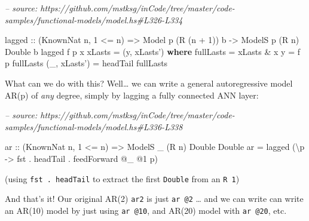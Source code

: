 \documentclass[]{article}
\newenvironment{Shaded}{}{}
\newcommand{\CommentTok}[1]{\textcolor[rgb]{0.38,0.63,0.69}{\textit{#1}}}
\newcommand{\DataTypeTok}[1]{\textcolor[rgb]{0.56,0.13,0.00}{#1}}
\newcommand{\DecValTok}[1]{\textcolor[rgb]{0.25,0.63,0.44}{#1}}
\newcommand{\FunctionTok}[1]{\textcolor[rgb]{0.02,0.16,0.49}{#1}}
\newcommand{\KeywordTok}[1]{\textcolor[rgb]{0.00,0.44,0.13}{\textbf{#1}}}
\newcommand{\NormalTok}[1]{#1}
\newcommand{\OtherTok}[1]{\textcolor[rgb]{0.00,0.44,0.13}{#1}}
\begin{document}
\begin{Shaded}
\begin{Highlighting}[]
\CommentTok{-- source: https://github.com/mstksg/inCode/tree/master/code-samples/functional-models/model.hs#L326-L334}

\NormalTok{lagged}
\OtherTok{    ::}\NormalTok{ (}\DataTypeTok{KnownNat}\NormalTok{ n, }\DecValTok{1} \FunctionTok{<=}\NormalTok{ n)}
    \OtherTok{=>} \DataTypeTok{Model}\NormalTok{  p       (}\DataTypeTok{R}\NormalTok{ (n }\FunctionTok{+} \DecValTok{1}\NormalTok{)) b}
    \OtherTok{->} \DataTypeTok{ModelS}\NormalTok{ p (}\DataTypeTok{R}\NormalTok{ n) }\DataTypeTok{Double}\NormalTok{      b}
\NormalTok{lagged f p x xLasts }\FunctionTok{=}\NormalTok{ (y, xLasts')}
  \KeywordTok{where}
\NormalTok{    fullLasts    }\FunctionTok{=}\NormalTok{ xLasts }\FunctionTok{&}\NormalTok{ x}
\NormalTok{    y            }\FunctionTok{=}\NormalTok{ f p fullLasts}
\NormalTok{    (_, xLasts') }\FunctionTok{=}\NormalTok{ headTail fullLasts}
\end{Highlighting}
\end{Shaded}

What can we do with this? Well\ldots{} we can write a general autoregressive
model AR(p) of \emph{any} degree, simply by lagging a fully connected ANN layer:

\begin{Shaded}
\begin{Highlighting}[]
\CommentTok{-- source: https://github.com/mstksg/inCode/tree/master/code-samples/functional-models/model.hs#L336-L338}

\OtherTok{ar ::}\NormalTok{ (}\DataTypeTok{KnownNat}\NormalTok{ n, }\DecValTok{1} \FunctionTok{<=}\NormalTok{ n)}
   \OtherTok{=>} \DataTypeTok{ModelS}\NormalTok{ _ (}\DataTypeTok{R}\NormalTok{ n) }\DataTypeTok{Double} \DataTypeTok{Double}
\NormalTok{ar }\FunctionTok{=}\NormalTok{ lagged (\textbackslash{}p }\OtherTok{->}\NormalTok{ fst }\FunctionTok{.}\NormalTok{ headTail }\FunctionTok{.}\NormalTok{ feedForward }\FunctionTok{@}\NormalTok{_ }\FunctionTok{@}\DecValTok{1}\NormalTok{ p)}
\end{Highlighting}
\end{Shaded}

(using \texttt{fst\ .\ headTail} to extract the first \texttt{Double} from an
\texttt{R\ 1})

And that's it! Our original AR(2) \texttt{ar2} is just \texttt{ar\ @2} \ldots{}
and we can write can write an AR(10) model by just using \texttt{ar\ @10}, and
AR(20) model with \texttt{ar\ @20}, etc.
\end{document}

